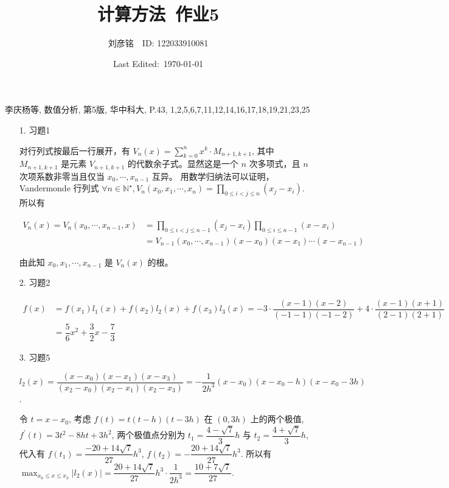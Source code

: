 \documentclass{article}
\title{计算方法\ 作业5}
\author{刘彦铭\ \ ID: 122033910081}
\date{Last Edited:\ \today}
\begin{document}
\maketitle

李庆杨等, 数值分析, 第5版, 华中科大, P.43,
1,2,5,6,7,11,12,14,16,17,18,19,21,23,25

\begin{spacing}{1.5}
\begin{itemize}
    \item [1.] 习题1
    
    对行列式按最后一行展开，有 $V_n(x) = \sum_{k=0}^{n} x^k \cdot M_{n+1,k+1}$, 其中 $M_{n+1, k+1}$ 是元素 $V_{n+1,k+1}$ 的代数余子式。显然这是一个 $n$ 次多项式，且 $n$ 次项系数非零当且仅当 $x_0,\cdots, x_{n-1}$ 互异。 用数学归纳法可以证明，Vandermonde 行列式 $\forall n\in\mathbb{N}^\star, V_n(x_0, x_1, \cdots, x_n) = \prod_{0\leq i < j \leq n} (x_j - x_i)$. 所以有 

    $\begin{array}{ll}V_n(x) = V_n(x_0,\cdots,x_{n-1}, x) &= \prod_{0\leq i < j \leq n-1} (x_j - x_i) \prod_{0\leq i \leq n-1} (x - x_i) \\ &= V_{n-1}(x_0,\cdots, x_{n-1}) (x-x_0)(x-x_1)\cdots(x-x_{n-1})\end{array}$

    由此知 $x_0, x_1, \cdots, x_{n-1}$ 是 $V_n(x)$ 的根。

    \item [2.] 习题2
    
    $\begin{array}{ll}f(x) &= f(x_1)l_1(x) + f(x_2)l_2(x) + f(x_3)l_3(x) = -3\cdot\dfrac{(x-1)(x-2)}{(-1-1)(-1-2)} + 4\cdot\dfrac{(x-1)(x+1)}{(2-1)(2+1)} \\ &= \dfrac{5}{6}x^2 + \dfrac{3}{2}x - \dfrac{7}{3} \end{array}$

    \item [3.] 习题5
    
    $l_2(x) = \dfrac{(x - x_0)(x - x_1)(x - x_3)}{(x_2 - x_0)(x_2 - x_1)(x_2 - x_3)} = -\dfrac{1}{2h^3}(x - x_0)(x - x_0 - h)(x - x_0 - 3h)$.

    令 $t = x - x_0$, 考虑 $f(t) = t(t-h)(t-3h)$ 在 $(0, 3h)$ 上的两个极值, $f^\prime(t) = 3t^2 - 8ht + 3h^2$, 两个极值点分别为 $t_1 = \dfrac{4-\sqrt{7}}{3}h$ 与 $t_2 = \dfrac{4+\sqrt{7}}{3}h$, 代入有 $f(t_1) = \dfrac{-20 + 14\sqrt{7}}{27}h^3$, $f(t_2) = -\dfrac{20+14\sqrt{7}}{27}h^3$. 所以有 $\max_{x_0\leq x\leq x_3} |l_2(x)| = \dfrac{20+14\sqrt{7}}{27}h^3\cdot \dfrac{1}{2h^3}= \dfrac{10 + 7\sqrt{7}}{27}$.


\end{itemize}
\end{spacing}
\end{document}
